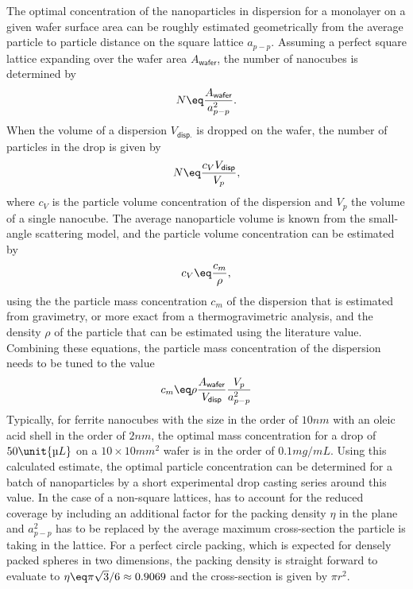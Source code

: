 \documentclass[\main/dresen_thesis.tex]{subfiles}
\begin{document}
  The optimal concentration of the nanoparticles in dispersion for a monolayer on a given wafer surface area can be roughly estimated geometrically from the average particle to particle distance on the square lattice $a_{p-p}$.
  Assuming a perfect square lattice expanding over the wafer area $A_{\textsf{wafer}}$, the number of nanocubes is determined by
  \begin{align}
    N \eq \frac{A_{\textsf{wafer}}}{a_{p-p}^2}.
  \end{align}
  When the volume of a dispersion $V_{\textsf{disp.}}$ is dropped on the wafer, the number of particles in the drop is given by
  \begin{align}
    N \eq \frac{c_V V_{\textsf{disp}}}{V_p},
  \end{align}
  where $c_V$ is the particle volume concentration of the dispersion and $V_p$ the volume of a single nanocube.
  The average nanoparticle volume is known from the small-angle scattering model, and the particle volume concentration can be estimated by
  \begin{align}
    c_V \eq \frac{c_m}{\rho},
  \end{align}
  using the the particle mass concentration $c_m$ of the dispersion that is estimated from gravimetry, or more exact from a thermogravimetric analysis, and the density $\rho$ of the particle that can be estimated using the literature value.
  Combining these equations, the particle mass concentration of the dispersion needs to be tuned to the value
  \begin{align}\label{eq:monolayers:preparation:particleConcentration}
    c_m \eq \rho \frac{A_{\textsf{wafer}}}{V_{\textsf{disp}}} \frac{V_p}{a_{p-p}^2}
  \end{align}
  Typically, for ferrite nanocubes with the size in the order of $10 \unit{nm}$ with an oleic acid shell in the order of $2 \unit{nm}$, the optimal mass concentration for a drop of $50 \unit{\text{\textmu} L}$ on a $10\times 10 \unit{mm^2}$ wafer is in the order of $0.1 \unit{mg/mL}$.
  Using this calculated estimate, the optimal particle concentration can be determined for a batch of nanoparticles by a short experimental drop casting series around this value.
  In the case of a non-square lattices,  has to account for the reduced coverage by including an additional factor for the packing density $\eta$ in the plane and $a_{p-p}^2$ has to be replaced by the average maximum cross-section the particle is taking in the lattice.
  For a perfect circle packing, which is expected for densely packed spheres in two dimensions, the packing density is straight forward to evaluate to $\eta \eq \pi \sqrt{3} / 6 \approx 0.9069$ and the cross-section is given by $\pi r^2$.
\end{document}
